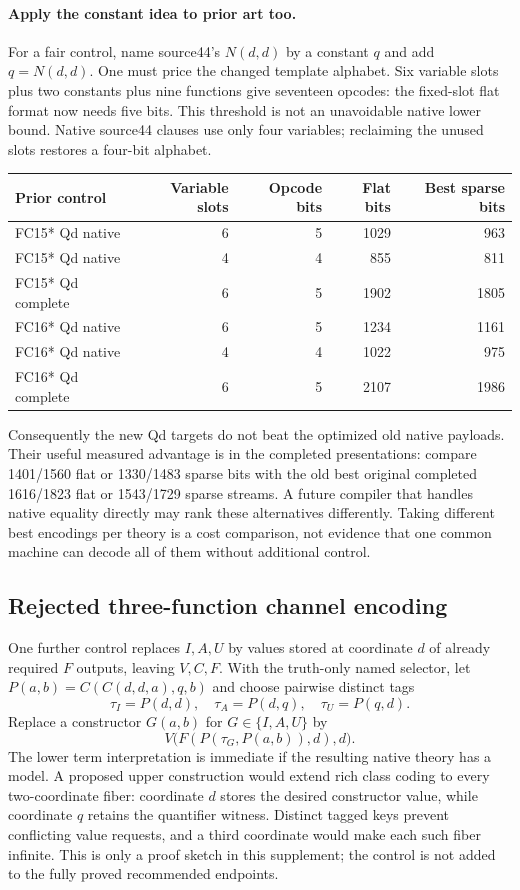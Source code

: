 \paragraph{Apply the constant idea to prior art too.}
For a fair control, name source44's $N(d,d)$ by a constant $q$ and add
$q=N(d,d)$.  One must price the changed template alphabet.  Six variable
slots plus two constants plus nine functions give seventeen opcodes: the
fixed-slot flat format now needs five bits.  This threshold is not an
unavoidable native lower bound.  Native source44 clauses use only four
variables; reclaiming the unused slots restores a four-bit alphabet.
\begin{center}
\begin{tabular}{lrrrr}
\toprule
Prior control & Variable slots & Opcode bits & Flat bits & Best sparse bits\\
\midrule
FC15* Qd native&6&5&1029&963\\
FC15* Qd native&4&4&855&811\\
FC15* Qd complete&6&5&1902&1805\\
FC16* Qd native&6&5&1234&1161\\
FC16* Qd native&4&4&1022&975\\
FC16* Qd complete&6&5&2107&1986\\
\bottomrule
\end{tabular}
\end{center}
Consequently the new Qd targets do not beat the optimized old native payloads.
Their useful measured advantage is in the completed presentations: compare
1401/1560 flat or 1330/1483 sparse bits with the old best original completed
1616/1823 flat or 1543/1729 sparse streams.  A future compiler that handles
native equality directly may rank these alternatives differently.  Taking
different best encodings per theory is a cost comparison, not evidence that
one common machine can decode all of them without additional control.

\subsection{Rejected three-function channel encoding}

One further control replaces $I,A,U$ by values stored at coordinate $d$ of
already required $F$ outputs, leaving $V,C,F$.  With the truth-only named
selector, let $P(a,b)=C(C(d,d,a),q,b)$ and choose pairwise distinct tags
\[
 \tau_I=P(d,d),\quad \tau_A=P(d,q),\quad \tau_U=P(q,d).
\]
Replace a constructor $G(a,b)$ for $G\in\{I,A,U\}$ by
\[
 V\bigl(F(P(\tau_G,P(a,b)),d),d\bigr).
\]
The lower term interpretation is immediate if the resulting native theory
has a model.  A proposed upper construction would extend rich class coding
to every two-coordinate fiber: coordinate $d$ stores the desired constructor
value, while coordinate $q$ retains the quantifier witness.  Distinct tagged
keys prevent conflicting value requests, and a third coordinate would make
each such fiber infinite.  This is only a proof sketch in this supplement;
the control is not added to the fully proved recommended endpoints.

